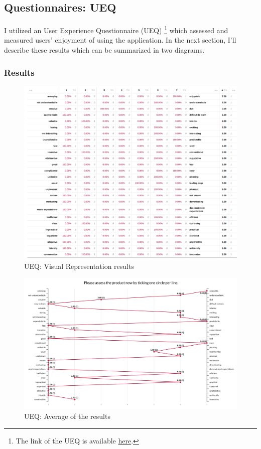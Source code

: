 \documentclass[multi, tikz, a4paper, oneside]{article}
\begin{document}
\subsection{Questionnaires: UEQ}
I utilized an User Experience Questionnaire (UEQ) \footnote{The link of the UEQ
is available \href{https://easy-feedback.com/docker-ui/1721729/sV3Xny}{here}.}
which assessed and measured users' enjoyment of using the application. In the
next section, I'll describe these results which can be summarized in two
diagrams.

\subsubsection{Results}
\begin{figure}[h!]
  \centering
  \includegraphics[scale=0.27]{survey-1}
  \caption{UEQ: Visual Representation results}
  \label{fig:ueq1}
\end{figure}

\begin{figure}[h!]
  \centering
  \includegraphics[scale=0.27]{survey-2}
  \caption{UEQ: Average of the results}
  \label{fig:ueq2}
\end{figure}
\end{document}

